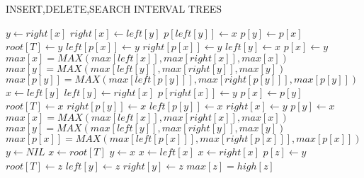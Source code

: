 \documentclass[11pt]{article}
\begin{document}
\begin{algorithm}
\caption{INSERT,DELETE,SEARCH INTERVAL TREES}\label{euclid}
\begin{algorithmic}[1]
\State $y \gets right[x]$
\State $right[x] \gets left[y]$
\State $p[left[y]] \gets x$ 
\EndIf
\State $p[y] \gets p[x]$
\State $root[T] \gets y$
\State $left[p[x]] \gets y$
\Else 
\State $right[p[x]] \gets y$
\EndIf
\State $ left[y] \gets x$
\State $ p[x] \gets y$
\State $max[x]=MAX(max[left[x]],max[right[x]],max[x])$ 
\State $max[y]=MAX(max[left[y]],max[right[y]],max[y])$
\State $max[p[y]]=MAX(max[left[p[y]]],max[right[p[y]]],max[p[y]])$
\EndProcedure
\\
 
\State $x \gets left[y]$
\State $left[y] \gets right[x]$
\State $p[right[x]] \gets y$
\EndIf
\State $p[x] \gets p[y]$
\State $root[T] \gets x$
\State $right[p[y]] \gets x$
\Else 
\State $left[p[y]] \gets x$
\EndIf
\State $ right[x] \gets y$
\State $ p[y] \gets x$
\State $max[x]=MAX(max[left[x]],max[right[x]],max[x])$
\State $max[y]=MAX(max[left[y]],max[right[y]],max[y])$
\State $max[p[x]]=MAX(max[left[p[x]]],max[right[p[x]]],max[p[x]])$
\EndProcedure
\\
\State $y \gets \textit{NIL}$
\State $x \gets root[T]$
\State $ y \gets x$
\State $x \gets left[x]$
\Else
\State $x \gets right[x]$
\EndIf
\EndWhile
\State $p[z] \gets y$
\State $root[T] \gets z$ 
\State $left[y] \gets z$
\Else
\State $right[y] \gets z$
\EndIf
\State $max[z]=high[z]$
\EndProcedure
\\
\end{algorithmic}
\end{algorithm}
\addtocounter{algorithm}{-1}
\end{document}
